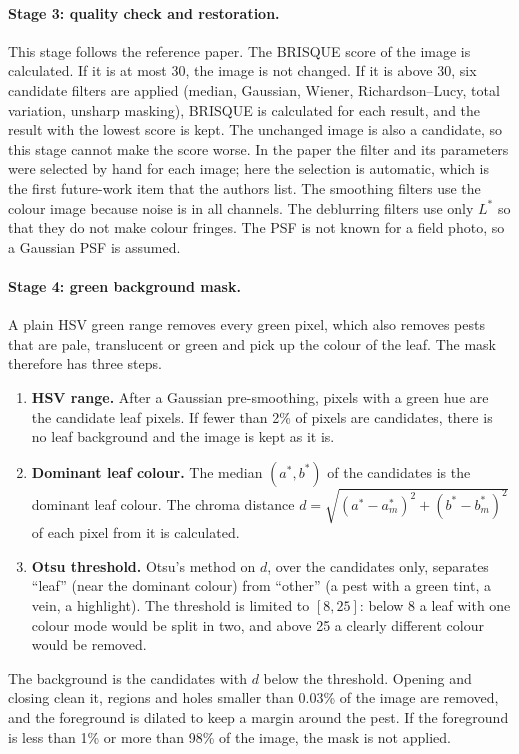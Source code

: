 \paragraph{Stage 3: quality check and restoration.} This stage follows the reference paper. The BRISQUE score of the image is calculated. If it is at most 30, the image is not changed. If it is above 30, six candidate filters are applied (median, Gaussian, Wiener, Richardson--Lucy, total variation, unsharp masking), BRISQUE is calculated for each result, and the result with the lowest score is kept. The unchanged image is also a candidate, so this stage cannot make the score worse. In the paper the filter and its parameters were selected by hand for each image; here the selection is automatic, which is the first future-work item that the authors list. The smoothing filters use the colour image because noise is in all channels. The deblurring filters use only $L^*$ so that they do not make colour fringes. The PSF is not known for a field photo, so a Gaussian PSF is assumed.

\paragraph{Stage 4: green background mask.} A plain HSV green range removes every green pixel, which also removes pests that are pale, translucent or green and pick up the colour of the leaf. The mask therefore has three steps.
\begin{enumerate}[nosep]
\item \textbf{HSV range.} After a Gaussian pre-smoothing, pixels with a green hue are the candidate leaf pixels. If fewer than 2\% of pixels are candidates, there is no leaf background and the image is kept as it is.
\item \textbf{Dominant leaf colour.} The median $(a^*, b^*)$ of the candidates is the dominant leaf colour. The chroma distance $d = \sqrt{(a^*-a^*_{m})^2 + (b^*-b^*_{m})^2}$ of each pixel from it is calculated.
\item \textbf{Otsu threshold.} Otsu's method on $d$, over the candidates only, separates ``leaf'' (near the dominant colour) from ``other'' (a pest with a green tint, a vein, a highlight). The threshold is limited to $[8, 25]$: below 8 a leaf with one colour mode would be split in two, and above 25 a clearly different colour would be removed.
\end{enumerate}
The background is the candidates with $d$ below the threshold. Opening and closing clean it, regions and holes smaller than 0.03\% of the image are removed, and the foreground is dilated to keep a margin around the pest. If the foreground is less than 1\% or more than 98\% of the image, the mask is not applied.


